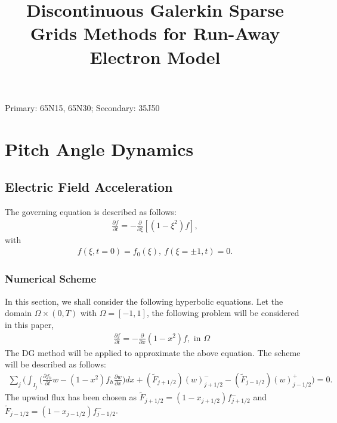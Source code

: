 \documentclass[final,leqno]{siamltex704}
\title{Discontinuous Galerkin Sparse Grids Methods for Run-Away Electron Model}
\author{
}
\begin{document}
\maketitle

\begin{abstract}

\end{abstract}

\begin{keywords}

\end{keywords}

\begin{AMS}
Primary: 65N15, 65N30; Secondary: 35J50
\end{AMS}
\pagestyle{myheadings}

\section{Pitch Angle Dynamics}
\subsection{Electric Field Acceleration}
The governing equation is described as follows:
\begin{eqnarray}
\frac{\partial f}{\partial t} = -\frac{\partial}{\partial \xi}[(1-\xi^2)f],
\end{eqnarray}
with
\begin{eqnarray}
f(\xi,t=0)=f_0(\xi),\ f(\xi=\pm 1,t)=0.
\end{eqnarray}

\subsubsection{Numerical Scheme}
In this section, we shall consider the following hyperbolic equations.
Let the domain $\Omega\times(0,T)$ with $\Omega=[-1,1]$, the following problem will be considered in this paper,
\begin{eqnarray}
&&\frac{\partial f}{\partial t} = -\frac{\partial}{\partial x}(1-x^2)f,\mbox{ in }\Omega\label{eq:hyper-pde}%
\end{eqnarray}
The DG method will be applied to approximate the above equation. The scheme will be described as follows:
\begin{eqnarray*}
\sum_j\bigg(\int_{I_j}\big(\frac{\partial f_h}{\partial t} w-(1-x^2)f_h\frac{\partial w}{\partial x}\big) dx + (\tilde{F}_{j+1/2})(w)_{j+1/2}^- -(\tilde{F}_{j-1/2})(w)_{j-1/2}^+ \bigg)= 0.
\end{eqnarray*}
The upwind flux has been chosen as
$\tilde{F}_{j+1/2}=(1-x_{j+1/2})f_{j+1/2}^-$ and $\tilde{F}_{j-1/2}=(1-x_{j-1/2})f_{j-1/2}^-$.
\end{document}
